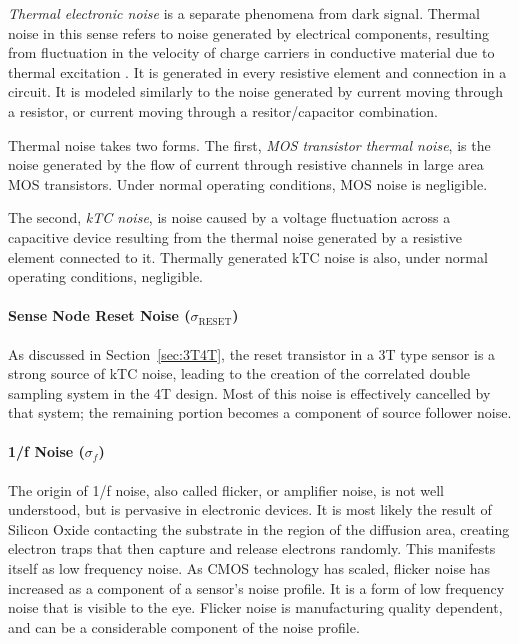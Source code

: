 \documentclass[10pt]{article}
\begin{document}
\emph{Thermal electronic noise} is a separate phenomena from dark signal. Thermal noise in this sense refers to noise generated by electrical components, resulting from fluctuation in the velocity of charge carriers in conductive material due to thermal excitation \cite{janesick}. It is generated in every resistive element and connection in a circuit. It is modeled similarly to the noise generated by current moving through a resistor, or current moving through a resitor/capacitor combination. 

Thermal noise takes two forms. The first, \emph{MOS transistor thermal noise}, is the noise generated by the flow of current through resistive channels in large area MOS transistors. Under normal operating conditions, MOS noise is negligible. 

The second, \emph{kTC noise}, is noise caused by a voltage fluctuation across a capacitive device resulting from the thermal noise generated by a resistive element connected to it. Thermally generated kTC noise is also, under normal operating conditions, negligible.

\paragraph{Sense Node Reset Noise (\boldmath $\sigma_{\text{RESET}}$)}

As discussed in Section~\ref{sec:3T4T}, the reset transistor in a 3T type sensor is a strong source of kTC noise, leading to the creation of the correlated double sampling system in the 4T design. Most of this noise is effectively cancelled by that system; the remaining portion becomes a component of source follower noise.

\paragraph{1/f Noise (\boldmath $\sigma_f$)}

The origin of 1/f noise, also called flicker, or amplifier noise, is not well understood, but is pervasive in electronic devices. It is most likely the result of Silicon Oxide contacting the substrate in the region of the diffusion area, creating electron traps that then capture and release electrons randomly. This manifests itself as low frequency noise. As CMOS technology has scaled, flicker noise has increased as a component of a sensor's noise profile. It is a form of low frequency noise that is visible to the eye. Flicker noise is manufacturing quality dependent, and can be a considerable component of the noise profile. 
\end{document}
